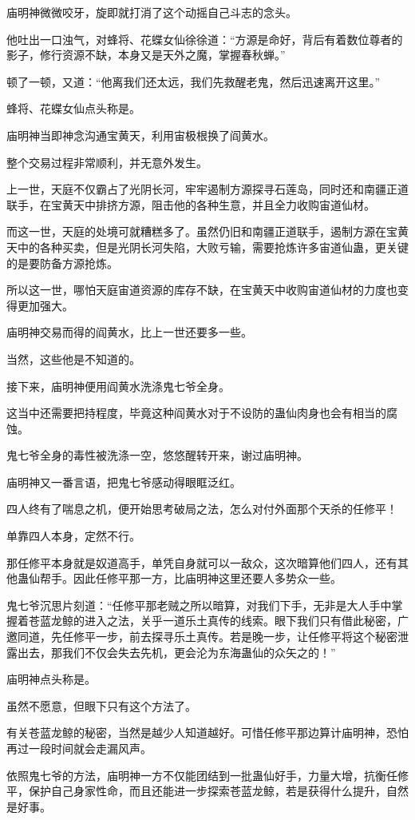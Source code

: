 \begin{this_body}
庙明神微微咬牙，旋即就打消了这个动摇自己斗志的念头。

他吐出一口浊气，对蜂将、花蝶女仙徐徐道：“方源是命好，背后有着数位尊者的影子，修行资源不缺，本身又是天外之魔，掌握春秋蝉。”

顿了一顿，又道：“他离我们还太远，我们先救醒老鬼，然后迅速离开这里。”

蜂将、花蝶女仙点头称是。

庙明神当即神念沟通宝黄天，利用宙极根换了阎黄水。

整个交易过程非常顺利，并无意外发生。

上一世，天庭不仅霸占了光阴长河，牢牢遏制方源探寻石莲岛，同时还和南疆正道联手，在宝黄天中排挤方源，阻击他的各种生意，并且全力收购宙道仙材。

而这一世，天庭的处境可就糟糕多了。虽然仍旧和南疆正道联手，遏制方源在宝黄天中的各种买卖，但是光阴长河失陷，大败亏输，需要抢炼许多宙道仙蛊，更关键的是要防备方源抢炼。

所以这一世，哪怕天庭宙道资源的库存不缺，在宝黄天中收购宙道仙材的力度也变得更加强大。

庙明神交易而得的阎黄水，比上一世还要多一些。

当然，这些他是不知道的。

接下来，庙明神便用阎黄水洗涤鬼七爷全身。

这当中还需要把持程度，毕竟这种阎黄水对于不设防的蛊仙肉身也会有相当的腐蚀。

鬼七爷全身的毒性被洗涤一空，悠悠醒转开来，谢过庙明神。

庙明神又一番言语，把鬼七爷感动得眼眶泛红。

四人终有了喘息之机，便开始思考破局之法，怎么对付外面那个天杀的任修平！

单靠四人本身，定然不行。

那任修平本身就是奴道高手，单凭自身就可以一敌众，这次暗算他们四人，还有其他蛊仙帮手。因此任修平那一方，比庙明神这里还要人多势众一些。

鬼七爷沉思片刻道：“任修平那老贼之所以暗算，对我们下手，无非是大人手中掌握着苍蓝龙鲸的进入之法，关乎一道乐土真传的线索。眼下我们只有借此秘密，广邀同道，先任修平一步，前去探寻乐土真传。若是晚一步，让任修平将这个秘密泄露出去，那我们不仅会失去先机，更会沦为东海蛊仙的众矢之的！”

庙明神点头称是。

虽然不愿意，但眼下只有这个方法了。

有关苍蓝龙鲸的秘密，当然是越少人知道越好。可惜任修平那边算计庙明神，恐怕再过一段时间就会走漏风声。

依照鬼七爷的方法，庙明神一方不仅能团结到一批蛊仙好手，力量大增，抗衡任修平，保护自己身家性命，而且还能进一步探索苍蓝龙鲸，若是获得什么提升，自然是好事。


\end{this_body}

